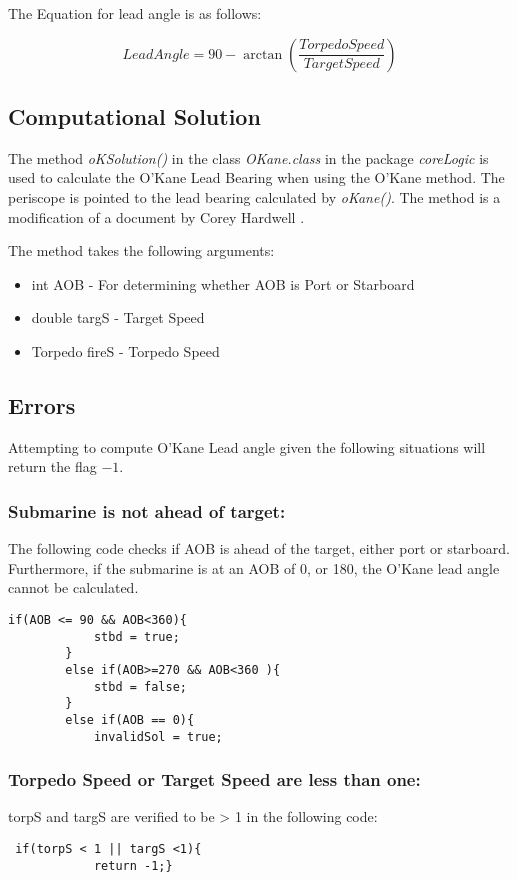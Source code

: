 \documentclass{article}
\begin{document}
The Equation for lead angle is as follows:

$$ LeadAngle = 90 - \arctan\left( \frac{Torpedo Speed}{TargetSpeed} \right) $$

\subsection{Computational Solution}
The method \emph{oKSolution()} in the class \emph{OKane.class} in the package \emph{coreLogic} is used to calculate the O'Kane Lead Bearing when using the O'Kane method. The periscope is pointed to the lead bearing calculated by \emph{oKane()}. The method is a modification of a document by Corey Hardwell \cite{okane90Angles}.

The method takes the following arguments:

\begin{itemize}
\item{int AOB - For determining whether AOB is Port or Starboard}
\item{double targS - Target Speed}
\item{Torpedo fireS - Torpedo Speed}
\end{itemize}

\subsection{Errors}

Attempting to compute O'Kane Lead angle given the following situations will return the flag \emph{$-1$}.

\subsubsection{Submarine is not ahead of target:}
The following code checks if AOB is ahead of the target, either port or starboard.
Furthermore, if the submarine is at an AOB of 0, or 180, the O'Kane lead angle cannot be calculated.
\begin{lstlisting}
if(AOB <= 90 && AOB<360){
            stbd = true;
        }
        else if(AOB>=270 && AOB<360 ){
            stbd = false;
        }
        else if(AOB == 0){
            invalidSol = true;
\end{lstlisting}

\subsubsection{Torpedo Speed or Target Speed are less than one:}
torpS and targS are verified to be > 1 in the following code:
\begin{lstlisting}
 if(torpS < 1 || targS <1){
            return -1;}
\end{lstlisting}
\end{document}
